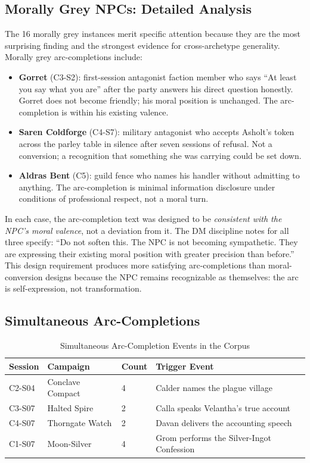 \subsection{Morally Grey NPCs: Detailed Analysis}

The 16 morally grey instances merit specific attention because they are the
most surprising finding and the strongest evidence for cross-archetype
generality. Morally grey arc-completions include:

\begin{itemize}
  \item \textbf{Gorret} (C3-S2): first-session antagonist faction member who
    says ``At least you say what you are'' after the party answers his direct
    question honestly. Gorret does not become friendly; his moral position is
    unchanged. The arc-completion is within his existing valence.

  \item \textbf{Saren Coldforge} (C4-S7): military antagonist who accepts
    Asholt's token across the parley table in silence after seven sessions of
    refusal. Not a conversion; a recognition that something she was carrying
    could be set down.

  \item \textbf{Aldras Bent} (C5): guild fence who names his handler without
    admitting to anything. The arc-completion is minimal information disclosure
    under conditions of professional respect, not a moral turn.
\end{itemize}

In each case, the arc-completion text was designed to be \textit{consistent
with the NPC's moral valence}, not a deviation from it. The DM discipline notes
for all three specify: ``Do not soften this. The NPC is not becoming sympathetic.
They are expressing their existing moral position with greater precision than
before.'' This design requirement produces more satisfying arc-completions than
moral-conversion designs because the NPC remains recognizable as themselves:
the arc is self-expression, not transformation.

\subsection{Simultaneous Arc-Completions}

\begin{table}[t]
\caption{Simultaneous Arc-Completion Events in the Corpus}
\label{tab:simultaneous}
\begin{tabular}{@{}lllp{3.8cm}@{}}
\toprule
\textbf{Session} & \textbf{Campaign} & \textbf{Count} & \textbf{Trigger Event} \\
\midrule
C2-S04 & Conclave Compact & 4 & Calder names the plague village \\
C3-S07 & Halted Spire     & 2 & Calla speaks Velantha's true account \\
C4-S07 & Thorngate Watch  & 2 & Davan delivers the accounting speech \\
C1-S07 & Moon-Silver      & 4 & Grom performs the Silver-Ingot Confession \\
\bottomrule
\end{tabular}
\end{table}

